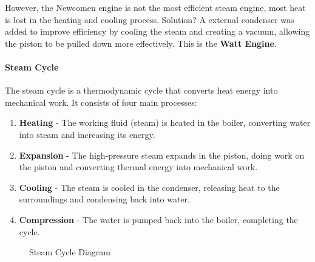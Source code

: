 \documentclass[11pt]{report}
\begin{document}
However, the Newcomen engine is not the most efficient steam engine, most heat is lost in the heating and cooling process. Solution? A external condenser was added to improve efficiency by cooling the steam and creating a vacuum, allowing the piston to be pulled down more effectively. This is the \textbf{Watt Engine}.

\paragraph{Steam Cycle} The steam cycle is a thermodynamic cycle that converts heat energy into mechanical work. It consists of four main processes: 
\begin{enumerate}
    \item \textbf{Heating} - The working fluid (steam) is heated in the boiler, converting water into steam and increasing its energy.
    \item \textbf{Expansion} - The high-pressure steam expands in the piston, doing work on the piston and converting thermal energy into mechanical work.
    \item \textbf{Cooling} - The steam is cooled in the condenser, releasing heat to the surroundings and condensing back into water.
    \item \textbf{Compression} - The water is pumped back into the boiler, completing the cycle.
\end{enumerate}

\begin{figure}[h!]
    \centering
    \caption{Steam Cycle Diagram}
\end{figure}
\end{document}
